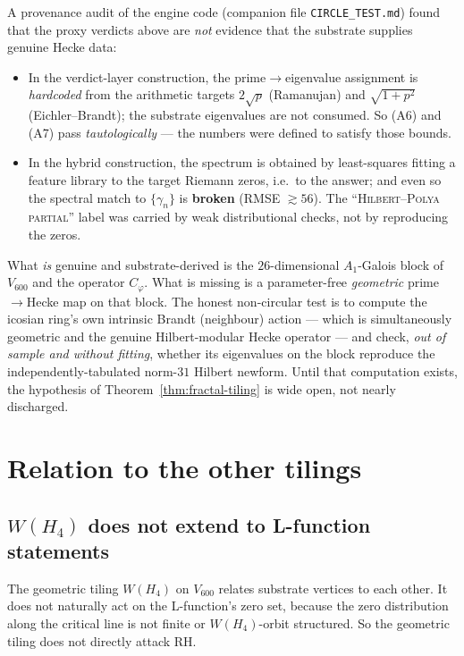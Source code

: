 \documentclass[11pt,a4paper]{article}
\theoremstyle{definition}
\begin{document}
\begin{tcolorbox}[colback=red!2,colframe=red!50!black,arc=2mm,
    title={\textbf{Honesty caveat: the proxy ``passes'' are not independent
    confirmation}},fonttitle=\bfseries,breakable]
A provenance audit of the engine code (companion file \texttt{CIRCLE\_TEST.md})
found that the proxy verdicts above are \emph{not} evidence that the substrate
supplies genuine Hecke data:
\begin{itemize}
\item In the verdict-layer construction, the prime$\to$eigenvalue assignment
      is \emph{hardcoded} from the arithmetic targets $2\sqrt p$ (Ramanujan)
      and $\sqrt{1+p^2}$ (Eichler--Brandt); the substrate eigenvalues are not
      consumed. So (A6) and (A7) pass \emph{tautologically} --- the numbers
      were defined to satisfy those bounds.
\item In the hybrid construction, the spectrum is obtained by least-squares
      fitting a feature library to the target Riemann zeros, i.e.\ to the
      answer; and even so the spectral match to $\{\gamma_n\}$ is \textbf{broken}
      (RMSE $\gtrsim 56$). The ``\textsc{Hilbert--Polya partial}'' label was
      carried by weak distributional checks, not by reproducing the zeros.
\end{itemize}
What \emph{is} genuine and substrate-derived is the $26$-dimensional
$A_1$-Galois block of $V_{600}$ and the operator $C_\varphi$. What is missing
is a parameter-free \emph{geometric} prime$\to$Hecke map on that block.
The honest non-circular test is to compute the icosian ring's own intrinsic
Brandt (neighbour) action --- which is simultaneously geometric and the
genuine Hilbert-modular Hecke operator --- and check, \emph{out of sample and
without fitting}, whether its eigenvalues on the block reproduce the
independently-tabulated norm-$31$ Hilbert newform. Until that computation
exists, the hypothesis of Theorem~\ref{thm:fractal-tiling} is wide open, not
nearly discharged.
\end{tcolorbox}

\section{Relation to the other tilings}

\subsection{$W(H_4)$ does not extend to L-function statements}
The geometric tiling $W(H_4)$ on $V_{600}$ relates substrate vertices to each
other. It does not naturally act on the L-function's zero set, because the
zero distribution along the critical line is not finite or $W(H_4)$-orbit
structured. So the geometric tiling does not directly attack RH.
\end{document}
